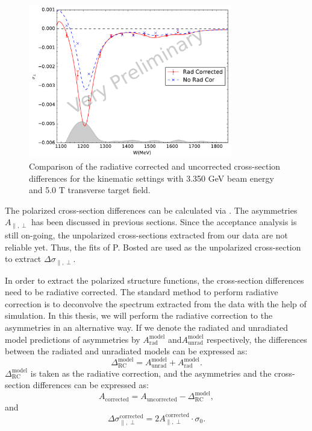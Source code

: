 \begin{figure}[tb!]
  \centering
  \includegraphics[width=0.79\textwidth]{figs/xsdiff-model-33505090.pdf}
  \caption[Cross-section differences with $E=3.350$ GeV and $B=5.0$ T.]{Comparison of the radiative corrected and uncorrected cross-section differences for the kinematic settings with 3.350 GeV beam energy and 5.0 T transverse target field. \label{C8S3F4}}
\end{figure}

The polarized cross-section differences can be calculated via . The asymmetries $A_{\parallel,\perp}$ has been discussed in previous sections. Since the acceptance analysis is still on-going, the unpolarized cross-sections extracted from our data are not reliable yet. Thus, the fits of P. Bosted \cite{Bosted2008} are used as the unpolarized cross-section to extract $\Delta\sigma_{\parallel,\perp}$.

In order to extract the polarized structure functions, the cross-section differences need to be radiative corrected. The standard method to perform radiative correction is to deconvolve the spectrum extracted from the data with the help of simulation. In this thesis, we will perform the radiative correction to the asymmetries in an alternative way. If we denote the radiated and unradiated model predictions of asymmetries by $A_{\mathrm{rad}}^{\mathrm{model}}$ and$A_{\mathrm{unrad}}^{\mathrm{model}}$ respectively, the differences between the radiated and unradiated models can be expressed as:
\begin{equation} \label{C8S3E1}
\Delta_{\mathrm{RC}}^{\mathrm{model}} = A_{\mathrm{unrad}}^{\mathrm{model}}+A_{\mathrm{rad}}^{\mathrm{model}}.
\end{equation}
$\Delta_{\mathrm{RC}}^{\mathrm{model}}$ is taken as the radiative correction, and the asymmetries and the cross-section differences can be expressed as:
\begin{equation} \label{C8S3E2}
A_{\mathrm{corrected}} = A_{\mathrm{uncorrected}}-\Delta_{\mathrm{RC}}^{\mathrm{model}},
\end{equation}
and
\begin{equation} \label{C8S3E3}
\Delta\sigma_{\parallel,\perp}^{\mathrm{corrected}} = 2A_{\parallel,\perp}^{\mathrm{corrected}} \cdot \sigma_0.
\end{equation}

